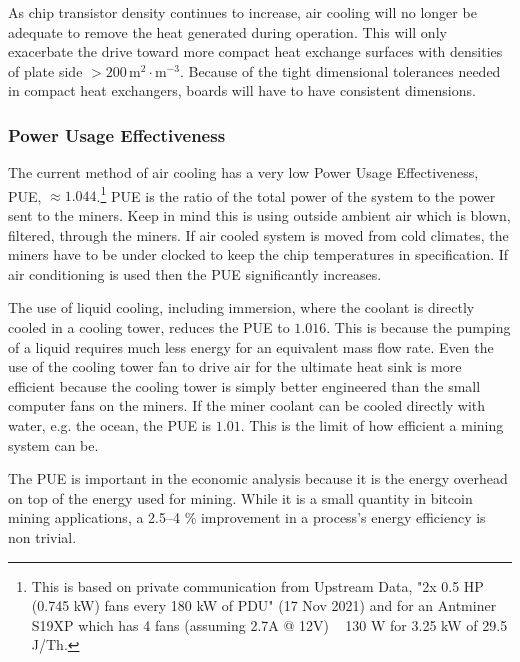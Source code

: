 \documentclass[runningheads]{llncs}
\begin{document}
As chip transistor density continues to increase, air cooling will no longer be adequate to remove the heat generated during operation.
This will only exacerbate the drive toward more compact heat exchange surfaces with densities of plate side $>200\,\textrm{m}^2\cdot\textrm{m}^{-3}$.
Because of the tight dimensional tolerances needed in compact heat exchangers, boards will have to have consistent dimensions.

\subsubsection{Power Usage Effectiveness}
The current method of air cooling has a very low Power Usage Effectiveness, PUE, $\approx 1.044$.\footnote{
    This is based on private communication from Upstream Data, "2x 0.5 HP (0.745 kW) fans every 180 kW of PDU" (17 Nov 2021) and for an Antminer S19XP  which has 4 fans (assuming 2.7A @ 12V) ~ 130 W for 3.25 kW of 29.5 J/Th.}
PUE is the ratio of the total power of the system to the power sent to the miners.
Keep in mind this is using outside ambient air which is blown, filtered, through the miners.
If air cooled system is moved from cold climates, the miners have to be under clocked to keep the chip temperatures in specification.
If air conditioning is used then the PUE significantly increases.

The use of liquid cooling, including immersion, where the coolant is directly cooled in a cooling tower, reduces the PUE to $1.016$.
This is because the pumping of a liquid requires much less energy for an equivalent mass flow rate.
Even the use of the cooling tower fan to drive air for the ultimate heat sink is more efficient because the cooling tower is simply better engineered than the small computer fans on the miners.
If the miner coolant can be cooled directly with water, e.g. the ocean, the PUE is $1.01$.
This is the limit of how efficient a mining system can be.

The PUE is important in the economic analysis because it is the energy overhead on top of the energy used for mining.
While it is a small quantity in bitcoin mining applications, a 2.5--4 \% improvement in a process's energy efficiency is non trivial.

\end{document}

